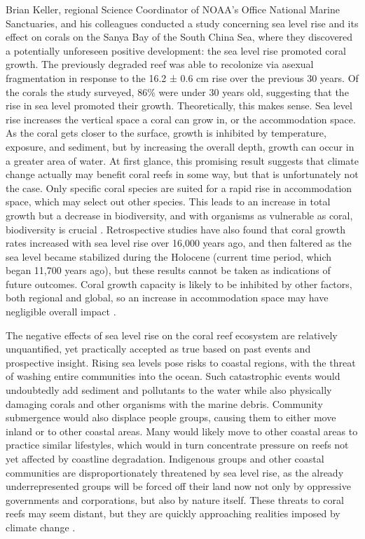 \documentclass{book}\usepackage{knitr}
\begin{document}
\begin{knitrout}
\begin{kframe}
Brian Keller, regional Science Coordinator of NOAA's Office National Marine Sanctuaries, and his colleagues conducted a study concerning sea level rise and its effect on corals on the Sanya Bay of the South China Sea, where they discovered a potentially unforeseen positive development: the sea level rise promoted coral growth. The previously degraded reef was able to recolonize via asexual fragmentation in response to the 16.2 ± 0.6 cm rise over the previous 30 years. Of the corals the study surveyed, 86\% were under 30 years old, suggesting that the rise in sea level promoted their growth. Theoretically, this makes sense. Sea level rise increases the vertical space a coral can grow in, or the accommodation space. As the coral gets closer to the surface, growth is inhibited by temperature, exposure, and sediment, but by increasing the overall depth, growth can occur in a greater area of water. At first glance, this promising result suggests that climate change actually may benefit coral reefs in some way, but that is unfortunately not the case. Only specific coral species are suited for a rapid rise in accommodation space, which may select out other species. This leads to an increase in total growth but a decrease in biodiversity, and with organisms as vulnerable as coral, biodiversity is crucial \citep{https://doi.org/10.1029/2018JC014534}. Retrospective studies have also found that coral growth rates increased with sea level rise over 16,000 years ago, and then faltered as the sea level became stabilized during the Holocene (current time period, which began 11,700 years ago), but these results cannot be taken as indications of future outcomes. Coral growth capacity is likely to be inhibited by other factors, both regional and global, so an increase in accommodation space may have negligible overall impact \citep{Keller2009ClimateCC}.

The negative effects of sea level rise on the coral reef ecosystem are relatively unquantified, yet practically accepted as true based on past events and prospective insight. Rising sea levels pose risks to coastal regions, with the threat of washing entire communities into the ocean.  Such catastrophic events would undoubtedly add sediment and pollutants to the water while also physically damaging corals and other organisms with the marine debris. Community submergence would also displace people groups, causing them to either move inland or to other coastal areas. Many would likely move to other coastal areas to practice similar lifestyles, which would in turn concentrate pressure on reefs not yet affected by coastline degradation. Indigenous groups and other coastal communities are disproportionately threatened by sea level rise, as the already underrepresented groups will be forced off their land now not only by oppressive governments and corporations, but also by nature itself. These threats to coral reefs may seem distant, but they are quickly approaching realities imposed by climate change \citep{Keller2009ClimateCC}.


\end{kframe}
\end{knitrout}
\end{document}
